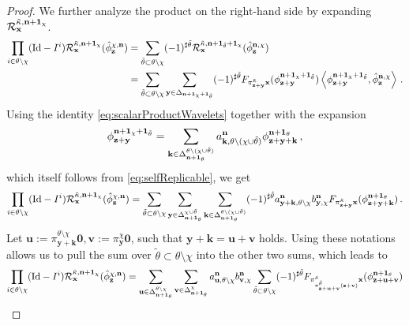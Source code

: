 \documentclass[12pt]{article}
\numberwithin{equation}{section}
\theoremstyle{plain}
\theoremstyle{definition}
\newcommand{\scalar}[1]{\left\langle #1 \right\rangle}
\newcommand{\Id}{\mbox{Id}}
\def\cR{\mathcal{R}}\def\cE{\mathcal{E}}
\def\fk{\mathbf k}\def\fl{\mathbf l}
\def\fu{\mathbf u}\def\fv{\mathbf v}
\def\fy{\mathbf y}\def\fz{\mathbf z}
\def\foo{{\boldsymbol 0}}
\def\fone{{\boldsymbol 1}}
\begin{document}
\begin{proof}
We further analyze the product on the right-hand side by expanding $\cR^{\tilde\kappa,\fn+\fone_\chi}_\fx$.
\begin{align*}
\prod_{i\in\theta\setminus\chi} (\Id-I^i)\mathcal{R}_\fx^{\tilde\kappa,\fn+\fone_\chi}(\hat\phi_\fz^{\chi,\fn}) &= \sum_{\tilde\theta\subset\theta\setminus\chi}(-1)^{\sharp{\tilde\theta}} \mathcal{R}^{\tilde\kappa,\fn+\fone_{\tilde\theta}+\fone_\chi}_\fx(\hat\phi_\fz^{\fn,\chi})\\
&= \sum_{\tilde\theta\subset\theta\setminus\chi}\sum_{\fy\in\Delta_{\fn+\fone_\chi+\fone_{\tilde\theta}}} (-1)^{\sharp\tilde\theta}F_{\pi^{\tilde\kappa}_{\fz+\fy}\fx}(\phi_{\fz+\fy}^{\fn+\fone_\chi+\fone_{\tilde\theta}})\scalar{\phi^{\fn+\fone_\chi+\fone_{\tilde\theta}}_{\fz+\fy},\hat\phi_\fz^{\fn,\chi}}\,.
    \end{align*}
    Using the identity \eqref{eq:scalarProductWavelets} together with the expansion 
    \[\phi_{\fz+\fy}^{\fn+\fone_\chi+\fone_{\tilde\theta}} = \sum_{\fk\in\Delta_{\fn+\fone_\theta}^{\theta\setminus(\chi\cup \tilde\theta)}} a^{\fn}_{\fk,\theta\setminus(\chi\cup\tilde\theta)}\phi_{\fz+\fy+\fk}^{\fn+\fone_\theta}\,,\] which itself follows from \eqref{eq:selfReplicable}, we get
    \begin{equation*}
        \prod_{i\in\theta\setminus\chi} (\Id-I^i)\mathcal{R}_\fx^{\tilde\kappa,\fn+\fone_\chi}(\hat\phi_\fz^{\chi,\fn}) = \sum_{\tilde\theta\subset\theta\setminus\chi} \sum_{\fy\in\Delta_{\fn+\fone_\theta}^{\chi\cup\tilde\theta}}\sum_{\fk\in\Delta_{\fn+\fone_\theta}^{\theta\setminus(\chi\cup\tilde\theta)}} (-1)^{\sharp\tilde\theta}a_{\fy+\fk, \theta\setminus\chi}^{\fn} b_{\fy,\chi}^{\fn}F_{\pi^{\tilde\kappa}_{\fz+\fy}\fx}(\phi_{\fz+\fy+\fk}^{\fn+\fone_\theta})\,.
    \end{equation*}
%
    Let $\fu := \pi_{\fy+\fk}^{\theta\setminus\chi} \foo, \fv := \pi_{\fy}^{\chi} \foo$, such that $\fy+\fk = \fu+\fv$ holds. Using these notations allows us to pull  the sum over $\tilde\theta\subset\theta\setminus\chi$ into the other two sums, which leads to
    \begin{align*}
        \prod_{i\in\theta\setminus\chi} (\Id-I^i)\mathcal{R}_\fx^{\tilde\kappa,\fn+\fone_\chi}(\hat\phi_\fz^{\chi,\fn}) &= \sum_{\fu\in\Delta_{\fn+\fone_\theta}^{\theta\setminus\chi}}\sum_{\fv\in\Delta_{\fn+\fone_\theta}^\chi} a_{\fu, \theta\setminus\chi}^{\fn} b_{\fv,\chi}^{\fn}\sum_{\tilde\theta\subset\theta\setminus\chi} (-1)^{\sharp\tilde\theta} F_{\pi^{\tilde\kappa}_{\pi^{\tilde\theta}_{\fz+\fu+\fv}(\fz+\fv)} \fx}(\phi_{\fz+\fu+\fv}^{\fn+\fone_\theta})\\

\end{align*}
\end{proof}
\end{document}
